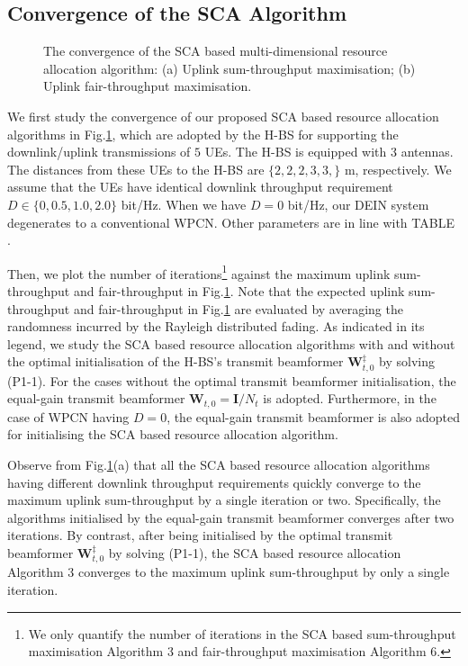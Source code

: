 \documentclass[12pt,draft,onecolumn,journal]{IEEEtran}
\begin{document}
\subsection{Convergence of the SCA Algorithm}

\begin{figure}[!t]
\setlength{\abovecaptionskip}{0pt}
\setlength{\belowcaptionskip}{0pt}\caption{The convergence of the SCA based multi-dimensional resource allocation algorithm: (a) Uplink sum-throughput maximisation; (b) Uplink fair-throughput maximisation.}
\label{fig:Iteration}
\end{figure}

We first study the convergence of our proposed SCA based resource allocation algorithms in Fig.\ref{fig:Iteration}, which are adopted by the H-BS for supporting the downlink/uplink transmissions of $5$ UEs. The H-BS is equipped with $3$ antennas. The distances from these UEs to the H-BS are $\{2,2,2,3,3,\}$ m, respectively. We assume that the UEs have identical downlink throughput requirement $D\in \{0,0.5,1.0,2.0\}$ bit/Hz. When we have $D=0$ bit/Hz, our DEIN system degenerates to a conventional WPCN. Other parameters are in line with TABLE \uppercase\expandafter{}.

Then, we plot the number of iterations\footnote{We only quantify the number of iterations in the SCA based sum-throughput maximisation Algorithm 3 and fair-throughput maximisation Algorithm 6.} against the maximum uplink sum-throughput and fair-throughput in Fig.\ref{fig:Iteration}. Note that the expected uplink sum-throughput and fair-throughput in Fig.\ref{fig:Iteration} are evaluated by averaging the randomness incurred by the Rayleigh distributed fading. As indicated in its legend, we study the SCA based resource allocation algorithms with and without the optimal initialisation of the H-BS's transmit beamformer $\mathbf{W}_{t,0}^{\ddagger}$ by solving (P1-1). For the cases without the optimal transmit beamformer initialisation, the equal-gain transmit beamformer $\mathbf{W}_{t,0} = \mathbf{I}/N_t$ is adopted. Furthermore, in the case of WPCN having $D = 0$, the equal-gain transmit beamformer is also adopted for initialising the SCA based resource allocation algorithm.

Observe from Fig.\ref{fig:Iteration}(a) that all the SCA based resource allocation algorithms having different downlink throughput requirements quickly converge to the maximum uplink sum-throughput by a single iteration or two. Specifically, the algorithms initialised by the equal-gain transmit beamformer converges after two iterations. By contrast, after being initialised by the optimal transmit beamformer $\mathbf{W}_{t,0}^{\ddagger}$ by solving (P1-1), the SCA based resource allocation Algorithm 3 converges to the maximum uplink sum-throughput by only a single iteration.
\end{document}
